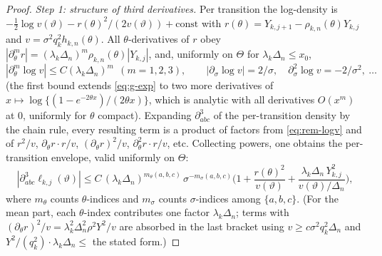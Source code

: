 \begin{proof}
\emph{Step 1: structure of third derivatives.}
Per transition the log-density is
$-\frac12\log v(\vartheta)-r(\theta)^2/(2v(\vartheta))+\text{const}$ with
$r(\theta)=Y_{k,j+1}-\rho_{k,n}(\theta)Y_{k,j}$ and
$v=\sigma^2q_k^2h_{k,n}(\theta)$. All $\theta$-derivatives of $r$ obey
$|\partial_\theta^m r|=(\lambda_k\Delta_n)^m\rho_{k,n}(\theta)|Y_{k,j}|$, and,
uniformly on $\Theta$ for $\lambda_k\Delta_n\le x_0$,
\begin{equation}\label{eq:rem-logv}
 |\partial_\theta^m\log v|\le C(\lambda_k\Delta_n)^m\ \ (m=1,2,3),
 \qquad
 |\partial_\sigma\log v|=2/\sigma,\quad
 \partial_\sigma^2\log v=-2/\sigma^2,\ \ldots
\end{equation}
(the first bound extends \eqref{eq:g-exp} to two more derivatives of
$x\mapsto\log\{(1-e^{-2\theta x})/(2\theta x)\}$, which is analytic with all
derivatives $O(x^m)$ at $0$, uniformly for $\theta$ compact). Expanding
$\partial^3_{abc}$ of the per-transition density by the chain rule, every
resulting term is a product of factors from \eqref{eq:rem-logv} and of
$r^2/v$, $\partial_\theta r\cdot r/v$, $(\partial_\theta r)^2/v$,
$\partial_\theta^2r\cdot r/v$, etc. Collecting powers, one obtains the
per-transition envelope, valid uniformly on $\Theta$:
\begin{equation}\label{eq:rem-envelope}
 |\partial^3_{abc}\ell_{k,j}(\vartheta)|
 \le C\,(\lambda_k\Delta_n)^{m_\theta(a,b,c)}\,\sigma^{-m_\sigma(a,b,c)}
 \Big(1+\frac{r(\theta)^2}{v(\vartheta)}
 +\frac{\lambda_k\Delta_n\,Y_{k,j}^2}{v(\vartheta)/\Delta_n}\Big),
\end{equation}
where $m_\theta$ counts $\theta$-indices and $m_\sigma$ counts
$\sigma$-indices among $\{a,b,c\}$. (For the mean part, each $\theta$-index
contributes one factor $\lambda_k\Delta_n$; terms with
$(\partial_\theta r)^2/v=\lambda_k^2\Delta_n^2\rho^2Y^2/v$ are absorbed in the
last bracket using $v\ge c\sigma^2q_k^2\Delta_n$ and
$Y^2/(q_k^2)\cdot\lambda_k\Delta_n\le$ the stated form.)


\end{proof}
